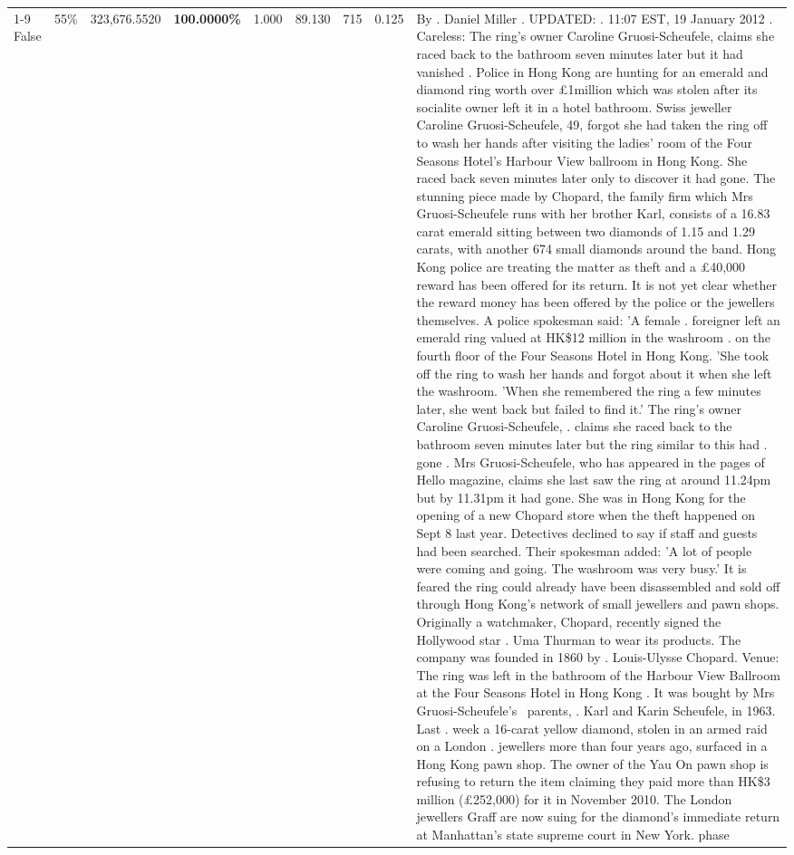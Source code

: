 \begin{table}[H]
\begin{tabular}{lllrlllll}
\cline{1-9} \cline{2-9}
False & 55\% & 323,676.5520 & \bfseries \color{red} 100.0000\% & 1.000 & 89.130 & 715 & 0.125 & By . Daniel Miller . UPDATED: . 11:07 EST, 19 January 2012 . Careless: The ring's owner Caroline Gruosi-Scheufele, claims she raced back to the bathroom seven minutes later but it had vanished . Police in Hong Kong are hunting for an emerald and diamond ring worth over £1million which was stolen after its socialite owner left it in a hotel bathroom. Swiss jeweller Caroline Gruosi-Scheufele, 49, forgot she had taken the ring off to wash her hands after visiting the ladies' room of the Four Seasons Hotel's Harbour View ballroom in Hong Kong. She raced back seven minutes later only to discover it had gone. The stunning piece made by Chopard, the family firm which Mrs Gruosi-Scheufele runs with her brother Karl, consists of a 16.83 carat emerald sitting between two diamonds of 1.15 and 1.29 carats, with another 674 small diamonds around the band. Hong Kong police are treating the matter as theft and a £40,000 reward has been offered for its return. It is not yet clear whether the reward money has been offered by the police or the jewellers themselves. A police spokesman said: 'A female . foreigner left an emerald ring valued at HK\$12 million in the washroom . on the fourth floor of the Four Seasons Hotel in Hong Kong. 'She took off the ring to wash her hands and forgot about it when she left the washroom. 'When she remembered the ring a few minutes later, she went back but failed to find it.' The ring's owner Caroline Gruosi-Scheufele, . claims she raced back to the bathroom seven minutes later but the ring similar to this had . gone . Mrs Gruosi-Scheufele, who has appeared in the pages of Hello magazine, claims she last saw the ring at around 11.24pm but by 11.31pm it had gone. She was in Hong Kong for the opening of a new Chopard store when the theft happened on Sept 8 last year. Detectives declined to say if staff and guests had been searched. Their spokesman added: 'A lot of people were coming and going. The washroom was very busy.' It is feared the ring could already have been disassembled and sold off through Hong Kong's network of small jewellers and pawn shops. Originally a watchmaker, Chopard, recently signed the Hollywood star . Uma Thurman to wear its products. The company was founded in 1860 by . Louis-Ulysse Chopard. Venue: The ring was left in the bathroom of the Harbour View Ballroom at the Four Seasons Hotel in Hong Kong . It was bought by Mrs Gruosi-Scheufele's  parents, . Karl and Karin Scheufele, in 1963. Last . week a 16-carat yellow diamond, stolen in an armed raid on a London . jewellers more than four years ago, surfaced in a Hong Kong pawn shop. The owner of the Yau On pawn shop is refusing to return the item claiming they paid more than HK\$3 million (£252,000) for it in November 2010. The London jewellers Graff are now suing for the diamond’s immediate return at Manhattan’s state supreme court in New York. phase \\

\end{tabular}
\end{table}
